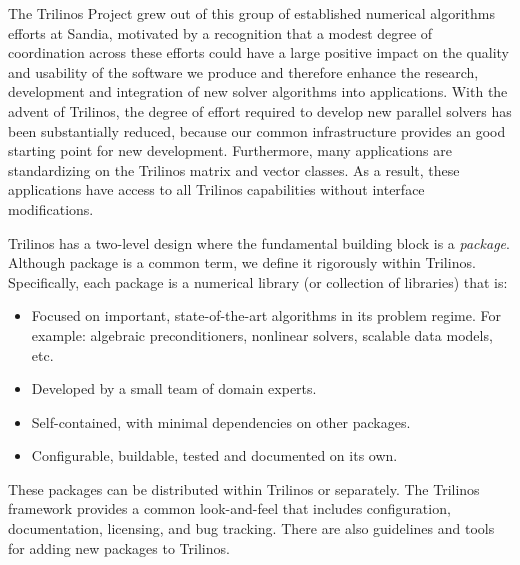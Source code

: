 \documentclass[acmtoms,acmnow]{acmtrans2m}
\begin{document}
The Trilinos Project grew out of this group of established numerical algorithms
efforts at Sandia, motivated by  a recognition that a modest degree of 
coordination across these efforts could have a large positive impact on 
the quality and usability of the software we produce and therefore enhance the
research, development and integration of new solver algorithms into
applications.  With the advent of Trilinos, the degree of effort required 
to develop new parallel solvers has been 
substantially reduced, because our common infrastructure provides an good 
starting point for new development.  Furthermore, many applications 
are standardizing on the 
Trilinos matrix and vector classes.  As a result, these applications
have access to all Trilinos capabilities without  
interface modifications. 

Trilinos has a two-level design where the fundamental building block
is a {\it package}.  Although package is a common term, we define it
rigorously within Trilinos.  Specifically, each package is a numerical
library (or collection of libraries) that is:
\begin{itemize}
\item Focused on important, state-of-the-art algorithms in its problem
regime.  For example: algebraic preconditioners, nonlinear solvers, 
scalable data models, etc.
\item Developed by a small team of domain experts.
\item Self-contained, with minimal dependencies on other packages.
\item Configurable, buildable, tested and documented on its own.
\end{itemize}
These packages can be distributed within Trilinos or separately. 
The Trilinos framework provides a common look-and-feel that 
includes configuration, documentation, licensing, and bug 
tracking.  There are also guidelines and tools for adding new packages 
to Trilinos. 
\end{document}
